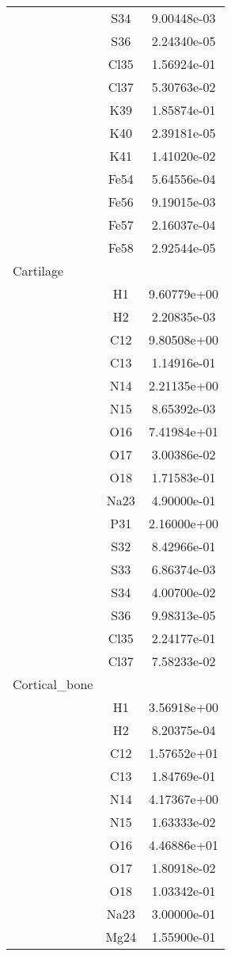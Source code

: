 \begin{centering}
\begin{longtable}{l c c}
& S34 & 9.00448e-03 \\ 
& S36 & 2.24340e-05 \\ 
& Cl35 & 1.56924e-01 \\ 
& Cl37 & 5.30763e-02 \\ 
& K39 & 1.85874e-01 \\ 
& K40 & 2.39181e-05 \\ 
& K41 & 1.41020e-02 \\ 
& Fe54 & 5.64556e-04 \\ 
& Fe56 & 9.19015e-03 \\ 
& Fe57 & 2.16037e-04 \\ 
& Fe58 & 2.92544e-05 \\ 
\hline
Cartilage & & \\
\hline
& H1 & 9.60779e+00 \\ 
& H2 & 2.20835e-03 \\ 
& C12 & 9.80508e+00 \\ 
& C13 & 1.14916e-01 \\ 
& N14 & 2.21135e+00 \\ 
& N15 & 8.65392e-03 \\ 
& O16 & 7.41984e+01 \\ 
& O17 & 3.00386e-02 \\ 
& O18 & 1.71583e-01 \\ 
& Na23 & 4.90000e-01 \\ 
& P31 & 2.16000e+00 \\ 
& S32 & 8.42966e-01 \\ 
& S33 & 6.86374e-03 \\ 
& S34 & 4.00700e-02 \\ 
& S36 & 9.98313e-05 \\ 
& Cl35 & 2.24177e-01 \\ 
& Cl37 & 7.58233e-02 \\ 
\hline
Cortical_bone & & \\
\hline
& H1 & 3.56918e+00 \\ 
& H2 & 8.20375e-04 \\ 
& C12 & 1.57652e+01 \\ 
& C13 & 1.84769e-01 \\ 
& N14 & 4.17367e+00 \\ 
& N15 & 1.63333e-02 \\ 
& O16 & 4.46886e+01 \\ 
& O17 & 1.80918e-02 \\ 
& O18 & 1.03342e-01 \\ 
& Na23 & 3.00000e-01 \\ 
& Mg24 & 1.55900e-01 \\ 

\end{longtable}
\end{centering}
